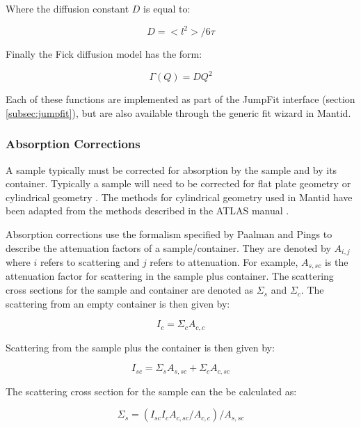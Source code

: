 \documentclass[paper=a4, fontsize=11pt]{scrartcl}	%
\numberwithin{equation}{section}															%
\numberwithin{figure}{section}																%
\numberwithin{table}{section}																%
\begin{document}
Where the diffusion constant $D$ is equal to:

\begin{equation}
D=<l^2>/6\tau
\end{equation}

Finally the Fick diffusion model \citep{fick1855v} has the form:

\begin{equation}
\Gamma(Q) = DQ^2
\end{equation}

Each of these functions are implemented as part of the JumpFit interface (section \ref{subsec:jumpfit}), but are also available through the generic fit wizard in Mantid.

\subsubsection{Absorption Corrections}
A sample typically must be corrected for absorption by the sample and by its container. Typically a sample will need to be corrected for flat plate geometry \citep{ccarlile1974} or cylindrical geometry \citep{aksoper1989}. The methods for cylindrical geometry used in Mantid have been adapted from the methods described in the ATLAS manual \citep{aksoper1989}.

Absorption corrections use the formalism specified by Paalman and Pings \citep{hhpaalman1962} to describe the attenuation factors of a sample/container. They are denoted by $A_{i,j}$ where $i$ refers to scattering and $j$ refers to attenuation. For example, $A_{s,sc}$ is the attenuation factor for scattering in the sample plus container. The scattering cross sections for the sample and container are denoted as $\Sigma_s$ and $\Sigma_c$. The scattering from an empty container is then given by:

\begin{equation}
I_c = \Sigma_c A_{c,c}
\end{equation}

Scattering from the sample plus the container is then given by:

\begin{equation}
I_{sc} = \Sigma_s A_{s,sc} + \Sigma_c A_{c,sc}
\end{equation}

The scattering cross section for the sample can the be calculated as:

\begin{equation}
\Sigma_s = (I_{sc}I_cA_{c,sc}/A_{c,c}) / A_{s,sc}
\end{equation}
\end{document}
